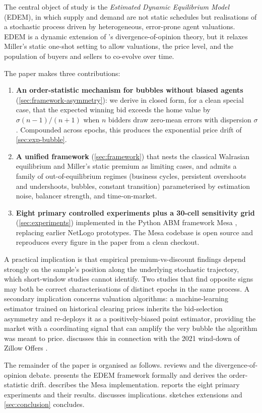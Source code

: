 The central object of study is the \emph{Estimated Dynamic Equilibrium
Model} (EDEM), in which supply and demand are not static schedules
but realisations of a stochastic process driven by heterogeneous,
error-prone agent valuations. EDEM is a dynamic extension of
\citet{miller1977}'s divergence-of-opinion theory, but it relaxes
Miller's static one-shot setting to allow valuations, the price
level, and the population of buyers and sellers to co-evolve over
time.

The paper makes three contributions:
\begin{enumerate}
\item \textbf{An order-statistic mechanism for bubbles without
biased agents} (\cref{sec:framework-asymmetry}): we derive in closed
form, for a clean special case, that the expected winning bid
exceeds the home value by $\sigma(n-1)/(n+1)$ when $n$ bidders
draw zero-mean errors with dispersion $\sigma$. Compounded across
epochs, this produces the exponential price drift of
\cref{sec:exp-bubble}.

\item \textbf{A unified framework} (\cref{sec:framework}) that nests
the classical Walrasian equilibrium and Miller's static premium as
limiting cases, and admits a family of out-of-equilibrium regimes
(business cycles, persistent overshoots and undershoots, bubbles,
constant transition) parameterised by estimation noise, balancer
strength, and time-on-market.

\item \textbf{Eight primary controlled experiments plus a 30-cell
sensitivity grid}
(\cref{sec:experiments}) implemented in the Python ABM framework
Mesa \citep{masad2015mesa}, replacing earlier
\citet{wilensky1999} NetLogo prototypes. The Mesa codebase is open
source and reproduces every figure in the paper from a clean
checkout.
\end{enumerate}

A practical implication is that empirical premium-vs-discount
findings depend strongly on the sample's position along the
underlying stochastic trajectory, which short-window studies cannot
identify. Two studies that find opposite signs may both be correct
characterisations of distinct epochs in the same process. A
secondary implication concerns valuation algorithms: a
machine-learning estimator trained on historical clearing prices
inherits the bid-selection asymmetry and re-deploys it as a
positively-biased point estimator, providing the market with a
coordinating signal that can amplify the very bubble the algorithm
was meant to price.  discusses this in connection
with the 2021 wind-down of Zillow Offers \citep{zillow2021ibuying}.

The remainder of the paper is organised as follows. 
reviews \citet{miller1977} and the divergence-of-opinion debate.
 presents the EDEM framework formally and derives
the order-statistic drift.  describes the
Mesa implementation.  reports the eight primary
experiments and their results.  discusses
implications.  sketches extensions and
\cref{sec:conclusion} concludes.
